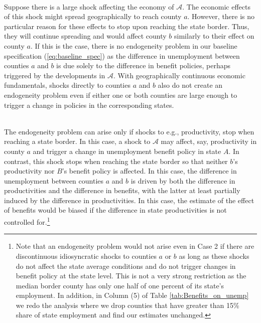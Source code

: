 \documentclass[12pt]{article}
\newcommand{\1}{\mathbf{1}}
\begin{document}
\vspace{0.3cm} \\
Suppose there is a large shock affecting the economy of $\mathcal{A}$. The economic effects of this shock might spread geographically to reach county $a$. However, there is no particular reason for these effects to stop upon reaching the state border. Thus, they will continue spreading and would affect county $b$ similarly to their effect on county $a$. If this is the case, there is no endogeneity problem in our baseline specification (\ref{eq:baseline_spec}) as the difference in unemployment between counties $a$ and $b$ is due solely to the difference in benefit policies, perhaps triggered by the developments in $\mathcal{A}$. With geographically continuous economic fundamentals, shocks directly to counties $a$ and $b$ also do not create an endogeneity problem even if either one or both counties are large enough to trigger a change in policies in the corresponding states.


\vspace{0.3cm} \\ The endogeneity problem can arise only if shocks to e.g., productivity, stop when reaching a state border. In this case, a shock to $\mathcal{A}$ may affect, say, productivity in county $a$ and trigger a change in unemployment benefit policy in state $A$. In contrast, this shock stops when reaching the state border so that neither $b$'s productivity nor $B$'s benefit policy is affected. In this case, the difference in unemployment between counties $a$ and $b$ is driven by both the difference in productivities and the difference in benefits, with the latter at least partially induced by the difference in productivities. In this case, the estimate of the effect of benefits would be biased if the difference in state productivities is not controlled for.\footnote{Note that an endogeneity problem would not arise even in Case 2 if there are discontinuous idiosyncratic shocks to counties $a$ or $b$ as long as these shocks do not affect the state average conditions and do not trigger changes in benefit policy at the state level. This is not a very strong restriction as the median border county has only one half of one percent of its state's employment. In addition, in Column (5) of Table \ref{tab:Benefits_on_unemp} we redo the analysis where we drop counties that have greater than 15\% share of state employment and find our estimates unchanged.}
\end{document}
